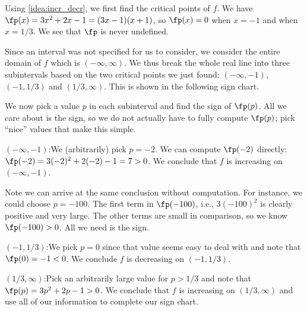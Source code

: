 {Using \autoref{idea:incr_decr}, we first find the critical points of $f$. We have $\fp(x) = 3x^2+2x-1 = (3x-1)(x+1)$, so $\fp(x) = 0$ when $x=-1$ and when $x=1/3$. We see that $\fp$ is never undefined.

Since an interval was not specified for us to consider, we consider the entire domain of $f$ which is $(-\infty,\infty)$. We thus break the whole real line into three subintervals based on the two critical points we just found: $(-\infty,-1)$, $(-1,1/3)$ and $(1/3,\infty)$. This is shown in the following sign chart.

\begin{center}
\end{center}

We now pick a value $p$ in each subinterval and find the sign of $\fp(p)$. All we care about is the sign, so we do not actually have to fully compute $\fp(p)$; pick ``nice'' values that make this simple.

\iflatexml\begin{description}\else\begin{description}[leftmargin=0pt]\fi
\item[Subinterval 1,] $(-\infty,-1)$:\quad We (arbitrarily) pick $p=-2$. We can compute $\fp(-2)$ directly: $\fp(-2) = 3(-2)^2+2(-2)-1=7>0$. We conclude that $f$ is increasing on $(-\infty,-1)$.

Note we can arrive at the same conclusion without computation. For instance, we could choose $p=-100$. The first term in $\fp(-100)$, i.e., $3(-100)^2$ is clearly positive and very large. The other terms are small in comparison, so we know $\fp(-100)>0$. All we need is the sign.

\item[Subinterval 2,] $(-1,1/3)$:\quad We pick $p=0$ since that value seems easy to deal with and note that $\fp(0)=-1<0$. We conclude $f$ is decreasing on $(-1,1/3)$.

\item[Subinterval 3,] $(1/3,\infty)$:\quad Pick an arbitrarily large value for $p>1/3$ and note that $\fp(p)=3p^2+2p-1>0$. We conclude that $f$ is increasing on $(1/3,\infty)$ and use all of our information to complete our sign chart.
\end{description}

\begin{center}
\end{center}


\end{description}}
